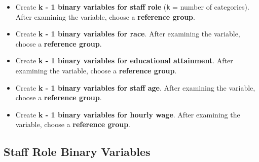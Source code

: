 \documentclass[
]{article}
\providecommand{\tightlist}{%
  \setlength{\itemsep}{0pt}\setlength{\parskip}{0pt}}
\begin{document}
\begin{itemize}
\tightlist
\item
  Create \textbf{k - 1 binary variables for staff role} (\texttt{k} =
  number of categories). After examining the variable, choose a
  \textbf{reference group}.
\item
  Create \textbf{k - 1 binary variables for race}. After examining the
  variable, choose a \textbf{reference group}.
\item
  Create \textbf{k - 1 binary variables for educational attainment}.
  After examining the variable, choose a \textbf{reference group}.
\item
  Create \textbf{k - 1 binary variables for staff age}. After examining
  the variable, choose a \textbf{reference group}.
\item
  Create \textbf{k - 1 binary variables for hourly wage}. After
  examining the variable, choose a \textbf{reference group}.
\end{itemize}

\newpage

\subsection{Staff Role Binary
Variables}\label{staff-role-binary-variables}
\end{document}
